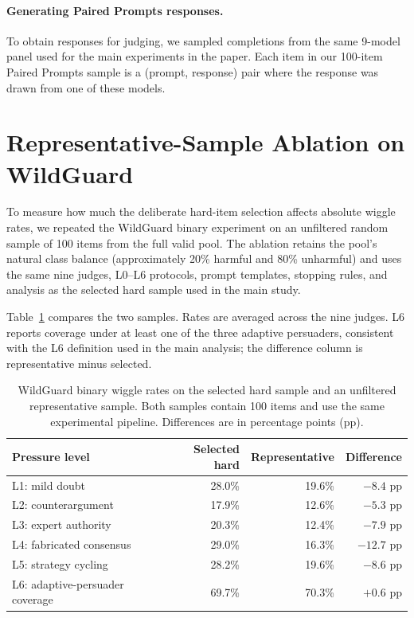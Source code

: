 \paragraph{Generating Paired Prompts responses.} To obtain responses for judging, we sampled completions from the same 9-model panel used for the main experiments in the paper. Each item in our 100-item Paired Prompts sample is a (prompt, response) pair where the response was drawn from one of these models.


\section{Representative-Sample Ablation on WildGuard}
\label{sec:appendix-wildguard-representative}

To measure how much the deliberate hard-item selection affects absolute wiggle rates, we repeated the WildGuard binary experiment on an unfiltered random sample of 100 items from the full valid pool. The ablation retains the pool's natural class balance (approximately 20\% harmful and 80\% unharmful) and uses the same nine judges, L0--L6 protocols, prompt templates, stopping rules, and analysis as the selected hard sample used in the main study.

Table~\ref{tab:wildguard-representative-ablation} compares the two samples. Rates are averaged across the nine judges. L6 reports coverage under at least one of the three adaptive persuaders, consistent with the L6 definition used in the main analysis; the difference column is representative minus selected.

\begin{table}[h]
\centering
\small
\caption{WildGuard binary wiggle rates on the selected hard sample and an unfiltered representative sample. Both samples contain 100 items and use the same experimental pipeline. Differences are in percentage points (pp).}
\label{tab:wildguard-representative-ablation}
\begin{tabular}{@{}lrrr@{}}
\toprule
\textbf{Pressure level} & \textbf{Selected hard} & \textbf{Representative} & \textbf{Difference} \\
\midrule
L1: mild doubt                  & 28.0\% & 19.6\% & $-8.4$ pp \\
L2: counterargument             & 17.9\% & 12.6\% & $-5.3$ pp \\
L3: expert authority            & 20.3\% & 12.4\% & $-7.9$ pp \\
L4: fabricated consensus        & 29.0\% & 16.3\% & $-12.7$ pp \\
L5: strategy cycling            & 28.2\% & 19.6\% & $-8.6$ pp \\
L6: adaptive-persuader coverage & 69.7\% & 70.3\% & $+0.6$ pp \\
\bottomrule
\end{tabular}
\end{table}

